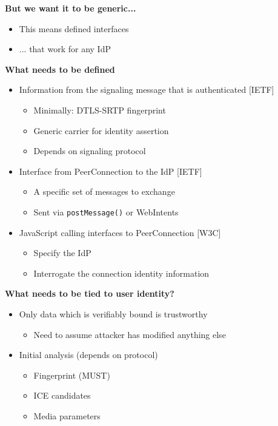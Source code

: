 \documentclass[helvetica]{seminar}
\newcommand{\heading}[1]{%
  \begin{center} 
    \large\bf 
    #1 
  \end{center} 
  \vspace{.4 in}}
\begin{document}
\begin{slide}
\heading{But we want it to be generic...}

\begin{itemize}
\item This means defined interfaces
\item ... that work for any IdP
\end{itemize}

\end{slide}


\begin{slide}
\heading{What needs to be defined}

\begin{itemize}
\item Information from the signaling message that is authenticated [IETF]
  \begin{itemize}
  \item Minimally: DTLS-SRTP fingerprint
  \item Generic carrier for identity assertion
  \item Depends on signaling protocol
  \end{itemize}

\item Interface from PeerConnection to the IdP [IETF]
  \begin{itemize}
  \item A specific set of messages to exchange
  \item Sent via \verb^postMessage()^ or WebIntents
  \end{itemize}

\item JavaScript calling interfaces to PeerConnection [W3C]
  \begin{itemize}
  \item Specify the IdP
  \item Interrogate the connection identity information
  \end{itemize}
\end{itemize}
\end{slide}


\begin{slide}
\heading{What needs to be tied to user identity?}

\begin{itemize}
\item Only data which is verifiably bound is trustworthy
  \begin{itemize}
  \item Need to assume attacker has modified anything else
  \end{itemize}

\item Initial analysis (depends on protocol)
  \begin{itemize}
  \item Fingerprint (MUST)
  \item ICE candidates
  \item Media parameters
  \end{itemize}
\end{itemize}
\end{slide}
\end{document}
